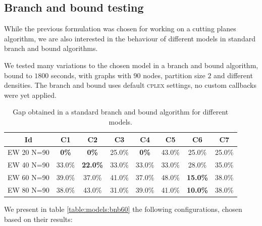 \subsection{Branch and bound testing}
\label{subsec:results:models:bnbtesting}

While the previous formulation was chosen for working on a cutting planes algorithm, we are also interested in the behaviour of different models in standard branch and bound algorithms. 

We tested many variations to the chosen model in a branch and bound algorithm, bound to $1800$ seconds, with graphs with $90$ nodes, partition size $2$ and different densities. The branch and bound uses default \textsc{cplex} settings, no custom callbacks were yet applied.

\begin{table}
\label{table:models:bnb}
\centering

\begin{tabular}{|c|c|c|c|c|c|c|c|}
\hline
\multicolumn{1}{|c|}{Id} & \multicolumn{1}{|c|}{C1} & \multicolumn{1}{|c|}{C2} & \multicolumn{1}{|c|}{C3}  & \multicolumn{1}{|c|}{C4} & \multicolumn{1}{|c|}{C5} & \multicolumn{1}{|c|}{C6} & \multicolumn{1}{|c|}{C7} 
\\
\hline
EW 20 N=90 & \textbf{0\%} & \textbf{0\%} & 25.0\%  & \textbf{0\%} & 43.0\% & 25.0\% & 25.0\%
\\
EW 40 N=90 & 33.0\% & \textbf{22.0\%} & 33.0\% & 33.0\% & 33.0\% & 28.0\% & 35.0\%
\\
EW 60 N=90 & 39.0\% & 37.0\% & 41.0\% & 37.0\% & 48.0\% & \textbf{15.0\%} & 38.0\%
\\
EW 80 N=90 & 38.0\% & 43.0\% & 31.0\% & 39.0\% & 41.0\% & \textbf{10.0\%} & 38.0\%
\\
\hline 
 \end{tabular}

\caption{Gap obtained in a standard branch and bound algorithm for different models.}

\end{table}

We present in table \ref{table:models:bnb60} the following configurations, chosen based on their results:

\begin{itemize}
\end{itemize}

